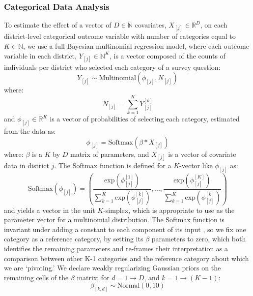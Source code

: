 \documentclass[12pt]{article}
\begin{document}
\subsubsection{Categorical Data Analysis}
To estimate the effect of a vector of $D\in\mathbb{N}$ covariates, $X_{[j]}\in \mathbb{R}^D$, on each district-level categorical outcome variable with number of categories equal to $K\in\mathbb{N}$, we use a full Bayesian multinomial regression model, where each outcome variable in each district, $Y_{[j]}\in \mathbb{N}^K$, is a vector composed of the counts of individuals per district who selected each category of a survey question:
\begin{equation}
Y_{[j]} \sim \text{Multinomial}( \phi_{[j]},N_{[j]})
\end{equation}
where:
\begin{equation} N_{[j]} = \sum\limits_{k=1}^K Y^{[k]}_{[j]}
\end{equation}
and $\phi_{[j]}\in\mathbb{R}^K$ is a vector of probabilities of selecting each category, estimated from the data as:
\begin{equation}
\phi_{[j]}=\text{Softmax}( \beta*X_{[j]})
\end{equation}
where: $\beta$ is a $K$ by $D$ matrix of parameters, and $X_{[j]}$ is a vector of covariate data in district $j$. The Softmax function is defined for a $K$-vector like $\phi_{[j]}$ as:
\begin{equation}
\text{Softmax}(\phi_{[j]}) = \left(
\frac{\text{exp}({\phi_{[j]}^{[1]}})}{\sum\limits_{k=1}^K \text{exp}(\phi_{[j]}^{[k]})}
, ... ,
\frac{\text{exp}({\phi_{[j]}^{[K]}})}{\sum\limits_{k=1}^K \text{exp}(\phi_{[j]}^{[k]})}\right)
\end{equation}
and yields a vector in the unit $K$-simplex, which is appropriate to use as the parameter vector for a multinomial distribution. The Softmax function is invariant under adding a constant to each component of its input \citep{stan-manual:2013}, so we fix one category as a reference category, by setting its $\beta$  parameters to zero, which both identifies the remaining parameters and re-frames their interpretation as a comparison between other K-1 categories and the reference category about which we are `pivoting.'  We declare weakly regularizing Gaussian priors on the remaining cells of the $\beta$  matrix; for $d=1\to D$, and $k=1\to (K-1)$: 
\begin{equation}
\beta_{[k,d]} \sim \text{Normal}(0,10)
\end{equation}
\end{document}
